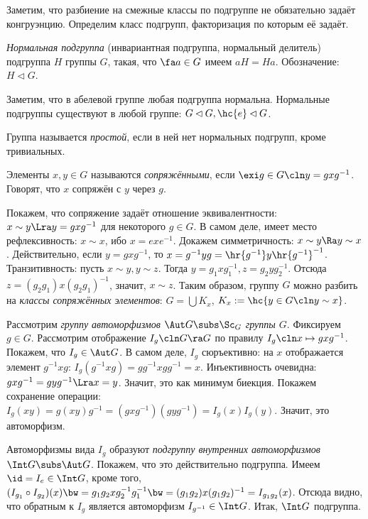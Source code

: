 \documentclass[a4paper]{article}
\begin{document}
Заметим, что разбиение на смежные классы по подгруппе не обязательно задаёт конгруэнцию. Определим класс
подгрупп, факторизация по которым её задаёт.

\begin{df}
\emph{Нормальная подгруппа} (инвариантная подгруппа, нормальный
делитель) подгруппа $H$ группы $G$, такая, что $\fa a \in G$
имеем $aH=Ha$. Обозначение: $H \lhd G$.
\end{df}

Заметим, что в абелевой группе любая подгруппа нормальна.
Нормальные подгруппы существуют в любой группе:
$G \lhd G, \hc{e} \lhd G$.

\begin{df}
Группа называется \emph{простой}, если в ней нет нормальных подгрупп, кроме тривиальных.
\end{df}

\begin{df}
Элементы $x,y \in G$ называются \emph{сопряжёнными}, если $\exi g \in G\cln y=gxg^{-1}$. Говорят, что
$x$ сопряжён с $y$ через $g$.
\end{df}

Покажем, что сопряжение задаёт отношение эквивалентности: $x\sim y \Lra y=gxg^{-1}$ для некоторого $g \in G$.
В самом деле, имеет место рефлексивность: $x \sim x$, ибо $x=exe^{-1}$. Докажем симметричность: $x \sim y \Ra
y \sim x$.  Действительно, если $y=gxg^{-1}$, то $x=g^{-1}yg=\hr{g^{-1}} y \hr{g^{-1}}^{-1}$. Транзитивность:
пусть $x \sim y, y \sim z$. Тогда $y=g_1xg_1^{-1}, z=g_2yg_2^{-1}$. Отсюда $z=(g_2g_1)x(g_2g_1)^{-1}$,
значит, $x \sim z$. Таким образом, группу $G$ можно разбить на \emph{классы сопряжённых элементов}:
$G = \bigcup K_x$, $K_x := \hc{y \in G\cln y \sim x}$.

Рассмотрим \emph{группу автоморфизмов $\Aut G \subs \Sc_G$ группы $G$}. Фиксируем  $g \in G$. Рассмотрим
отображение $I_g\cln G\ra G$ по правилу $I_g\cln x \mapsto gxg^{-1}$. Покажем, что $I_g \in \Aut G$. В самом деле,
$I_g$ сюръективно: на $x$ отображается элемент $g^{-1}xg$: $I_g(g^{-1}xg)=gg^{-1}xgg^{-1}=x$. Инъективность
очевидна: $gxg^{-1}=gyg^{-1} \Lra x=y$. Значит, это как минимум биекция. Покажем сохранение операции:
$I_g(xy)=g(xy)g^{-1}=(gxg^{-1})(gyg^{-1})=I_g(x)I_g(y)$. Значит, это автоморфизм.

\begin{df}
Автоморфизмы вида $I_g$ образуют \emph{подгруппу внутренних автоморфизмов}  $\Int G \subs \Aut G$. Покажем,
что это действительно подгруппа. Имеем $\id = I_e \in \Int G$, кроме того, $(I_{g_1}\circ
I_{g_2})(x) \bw= g_1g_2xg_2^{-1}g_1^{-1} \bw= (g_1g_2)x(g_1g_2)^{-1}=I_{g_1g_2}(x)$. Отсюда  видно, что обратным к
$I_g$ является автоморфизм $I_{g^{-1}} \in \Int G$. Итак, $\Int G$ подгруппа.
\end{df}
\end{document}
